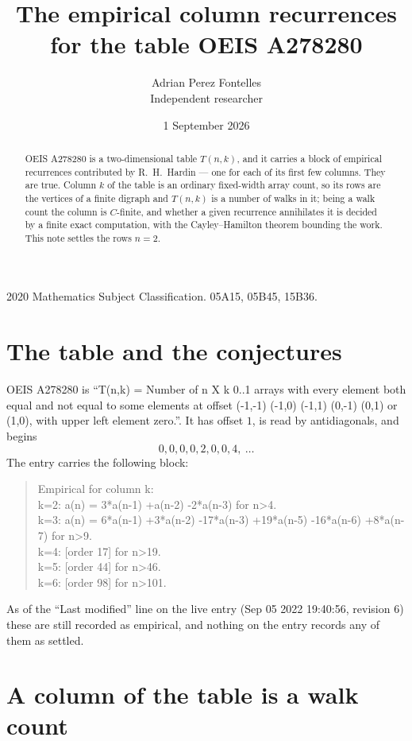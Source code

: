 \documentclass[11pt,a4paper]{article}
\title{The empirical column recurrences for the table OEIS A278280}
\author{Adrian Perez Fontelles\\ \small Independent researcher}
\date{1 September 2026}
\theoremstyle{plain}
\theoremstyle{definition}
\begin{document}
\maketitle

\begin{abstract}
OEIS A278280 is a two-dimensional table $T(n,k)$, and it carries a block of empirical
recurrences contributed by R.~H.~Hardin --- one for each of its first few columns. They are
true. Column $k$ of the table is an ordinary fixed-width array count, so its rows are the
vertices of a finite digraph and $T(n,k)$ is a number of walks in it; being a walk count the
column is $C$-finite, and whether a given recurrence annihilates it is decided by a finite
exact computation, with the Cayley--Hamilton theorem bounding the work. This note settles the rows $n=2$.
\end{abstract}

\noindent\small 2020 Mathematics Subject Classification. 05A15, 05B45, 15B36.\normalsize

\section{The table and the conjectures}

OEIS A278280 is ``T(n,k) = Number of n X k 0..1 arrays with every element both equal and not equal to some elements at offset (-1,-1) (-1,0) (-1,1) (0,-1) (0,1) or (1,0), with upper left element zero.''. It has offset $1$, is
read by antidiagonals, and begins
\[
0, 0, 0, 0, 2, 0, 0, 4,\ \dots
\]
The entry carries the following block:
\begin{quote}\small
Empirical for column k:\\
k=2: a(n) = 3*a(n-1) +a(n-2) -2*a(n-3) for n>4.\\
k=3: a(n) = 6*a(n-1) +3*a(n-2) -17*a(n-3) +19*a(n-5) -16*a(n-6) +8*a(n-7) for n>9.\\
k=4: [order 17] for n>19.\\
k=5: [order 44] for n>46.\\
k=6: [order 98] for n>101.\\
\end{quote}
As of the ``Last modified'' line on the live entry (Sep 05 2022 19:40:56, revision 6) these are still
recorded as empirical, and nothing on the entry records any of them as settled.

\section{A column of the table is a walk count}
\end{document}
